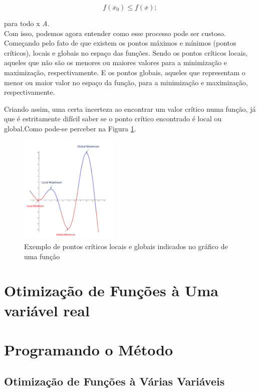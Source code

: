 			\begin{equation}
				f(x_0) \leq f(x);
			\end{equation}

		para todo x \in \textit{A}.\\


Com isso, podemos agora entender como esse processo pode ser custoso.
Começando pelo fato de que existem os pontos máximos e mínimos
(pontos críticos), locais e globais no espaço das funções. Sendo os pontos
críticos locais, aqueles que não são os menores ou maiores valores para a
minimização e maximização, respectivamente. E os pontos globais, aqueles que
representam o menor ou maior valor no espaço da função, para a minimização e
maximização, respectivamente.

Criando assim, uma certa incerteza ao encontrar um valor crítico numa função,
já que é estritamente difícil saber se o ponto crítico encontrado é local ou
global.Como pode-se perceber na Figura
\ref{grafico_local_global_pontosCriticos}.


\begin{figure}[h]
	\includegraphics[width=0.43\textwidth]
	{src/grafico_local_global_pontosCriticos.png}
	\centering
	\caption{Exemplo de pontos críticos locais e globais indicados no gráfico
	de uma função}
	\label{grafico_local_global_pontosCriticos}
\end{figure}




\section{{Otimização de Funções à Uma variável real}}

\hspace{0.8cm}






\section{{Programando o Método}}

\hspace{0.8cm}





\textcolor[rgb]{1,0,0}{\section{{Otimização de Funções à Várias Variáveis}}}

\hspace{0.8cm}





%
